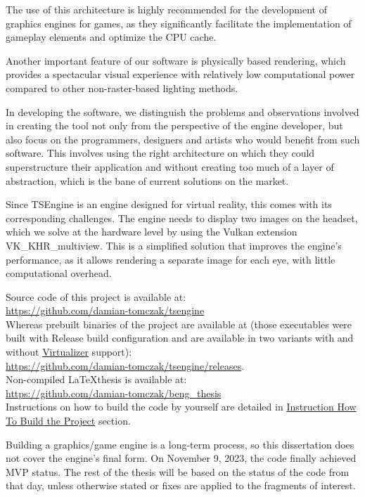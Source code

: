 The use of this architecture is highly recommended for the development of graphics engines for games, as they significantly facilitate the implementation of gameplay elements and optimize the CPU cache.

Another important feature of our software is physically based rendering, which provides a spectacular visual experience with relatively low computational power compared to other non-raster-based lighting methods.

In developing the software, we distinguish the problems and observations involved in creating the tool not only from the perspective of the engine developer, but also focus on the programmers, designers and artists who would benefit from such software. This involves using the right architecture on which they could superstructure their application and without creating too much of a layer of abstraction, which is the bane of current solutions on the market.

Since TSEngine is an engine designed for virtual reality, this comes with its corresponding challenges. The engine needs to display two images on the headset, which we solve at the hardware level by using the Vulkan extension VK\_KHR\_multiview. This is a simplified solution that improves the engine's performance, as it allows rendering a separate image for each eye, with little computational overhead.

Source code of this project is available at:\\
\href{https://github.com/damian-tomczak/tsengine}{https://github.com/damian-tomczak/tsengine}\\
Whereas prebuilt binaries of the project are available at (those executables were built with Release build configuration and are available in two variants with and without \hyperref[sec:hardware]{Virtualizer} support):\\
\href{https://github.com/damian-tomczak/tsengine/releases}{https://github.com/damian-tomczak/tsengine/releases}.\\
Non-compiled \LaTeX thesis is available at:\\
\href{https://github.com/damian-tomczak/beng_thesis}{https://github.com/damian-tomczak/beng\_thesis}\\
Instructions on how to build the code by yourself are detailed in \hyperref[sec:how_to_run]{Instruction How To Build the Project} section.

Building a graphics/game engine is a long-term process, so this dissertation does not cover the engine's final form.
On November 9, 2023, the code finally achieved MVP status. The rest of the thesis will be based on the status of the code from that day, unless otherwise stated or fixes are applied to the fragments of interest.

